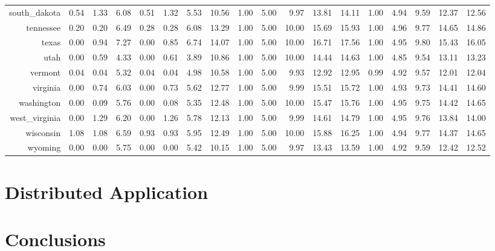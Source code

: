\documentclass{article} %
\begin{document}
\begin{table}[ht]
\begin{tabular}{rrrrrrrrrrrrrrrrrr}
  south\_dakota & 0.54 & 1.33 & 6.08 & 0.51 & 1.32 & 5.53 & 10.56 & 1.00 & 5.00 & 9.97 & 13.81 & 14.11 & 1.00 & 4.94 & 9.59 & 12.37 & 12.56 \\
  tennessee & 0.20 & 0.20 & 6.49 & 0.28 & 0.28 & 6.08 & 13.29 & 1.00 & 5.00 & 10.00 & 15.69 & 15.93 & 1.00 & 4.96 & 9.77 & 14.65 & 14.86 \\
  texas & 0.00 & 0.94 & 7.27 & 0.00 & 0.85 & 6.74 & 14.07 & 1.00 & 5.00 & 10.00 & 16.71 & 17.56 & 1.00 & 4.95 & 9.80 & 15.43 & 16.05 \\
  utah & 0.00 & 0.59 & 4.33 & 0.00 & 0.61 & 3.89 & 10.86 & 1.00 & 5.00 & 10.00 & 14.44 & 14.63 & 1.00 & 4.85 & 9.54 & 13.11 & 13.23 \\
  vermont & 0.04 & 0.04 & 5.32 & 0.04 & 0.04 & 4.98 & 10.58 & 1.00 & 5.00 & 9.93 & 12.92 & 12.95 & 0.99 & 4.92 & 9.57 & 12.01 & 12.04 \\
  virginia & 0.00 & 0.74 & 6.03 & 0.00 & 0.73 & 5.62 & 12.77 & 1.00 & 5.00 & 9.99 & 15.51 & 15.72 & 1.00 & 4.93 & 9.73 & 14.41 & 14.60 \\
  washington & 0.00 & 0.09 & 5.76 & 0.00 & 0.08 & 5.35 & 12.48 & 1.00 & 5.00 & 10.00 & 15.47 & 15.76 & 1.00 & 4.95 & 9.75 & 14.42 & 14.65 \\
  west\_virginia & 0.00 & 1.29 & 6.20 & 0.00 & 1.26 & 5.78 & 12.13 & 1.00 & 5.00 & 9.99 & 14.61 & 14.79 & 1.00 & 4.95 & 9.76 & 13.84 & 14.00 \\
  wisconsin & 1.08 & 1.08 & 6.59 & 0.93 & 0.93 & 5.95 & 12.49 & 1.00 & 5.00 & 10.00 & 15.88 & 16.25 & 1.00 & 4.94 & 9.77 & 14.37 & 14.65 \\
  wyoming & 0.00 & 0.00 & 5.75 & 0.00 & 0.00 & 5.42 & 10.15 & 1.00 & 5.00 & 9.97 & 13.43 & 13.59 & 1.00 & 4.92 & 9.59 & 12.42 & 12.52 \\
   \hline
\end{tabular}
\end{table}


\section{Distributed Application}


\section{Conclusions}
\end{document}
